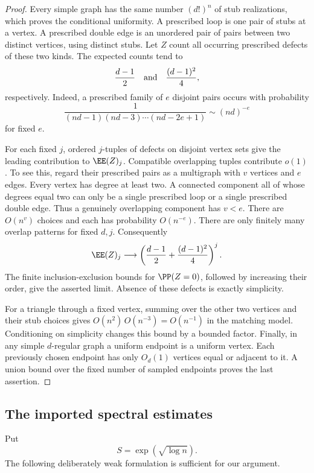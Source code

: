 \begin{proof}
Every simple graph has the same number \((d!)^n\) of stub realizations,
which proves the conditional uniformity.
A prescribed loop is one pair of stubs at a vertex. A prescribed
double edge is an unordered pair of pairs between two distinct vertices,
using distinct stubs. Let \(Z\) count all occurring prescribed defects
of these two kinds.
The expected counts tend to
\[
 \frac{d-1}{2}\quad\hbox{and}\quad\frac{(d-1)^2}{4},
\]
respectively.
Indeed, a prescribed family of \(e\) disjoint pairs occurs with
probability
\[
 \frac{1}{(nd-1)(nd-3)\cdots(nd-2e+1)}
       \sim(nd)^{-e}
\]
for fixed \(e\).

For each fixed \(j\), ordered \(j\)-tuples of defects on disjoint vertex
sets give the leading contribution to \(\EE(Z)_j\).
Compatible overlapping tuples contribute \(o(1)\).
To see this, regard their prescribed pairs as a multigraph with \(v\)
vertices and \(e\) edges. Every vertex has degree at least two. A
connected component all of whose degrees equal two can only be a
single prescribed loop or a single prescribed double edge.
Thus a genuinely overlapping component has \(v<e\). There are
\(O(n^v)\) choices and each has probability \(O(n^{-e})\).
There are only finitely many overlap patterns for fixed \(d,j\).
Consequently
\[
 \EE(Z)_j\longrightarrow
 \left(\frac{d-1}{2}+\frac{(d-1)^2}{4}\right)^j.
\]
The finite inclusion-exclusion bounds for \(\PP(Z=0)\), followed by
increasing their order, give the asserted limit. Absence of these
defects is exactly simplicity.

For a triangle through a fixed vertex, summing over the other two
vertices and their stub choices gives
\(O(n^2)\,O(n^{-3})=O(n^{-1})\) in the matching model.
Conditioning on simplicity changes this bound by a bounded factor.
Finally, in any simple \(d\)-regular graph a uniform endpoint is a
uniform vertex. Each previously chosen endpoint has only \(O_d(1)\)
vertices equal or adjacent to it. A union bound over the fixed number
of sampled endpoints proves the last assertion.
\end{proof}

\subsection{The imported spectral estimates}

Put
\[
 S=\exp(\sqrt{\log n}).
\]
The following deliberately weak formulation is sufficient for our
argument.

